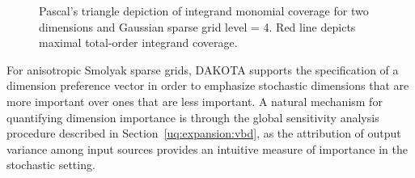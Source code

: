 \begin{figure}[htbp]
  \begin{subfigmatrix}{2}
  \end{subfigmatrix}
  \caption{Pascal's triangle depiction of integrand monomial coverage 
for two dimensions and Gaussian sparse grid level = 4.  Red line depicts 
maximal total-order integrand coverage.}
\label{fig:pascal_sparse_lev4_Gauss}
\end{figure}

For anisotropic Smolyak sparse grids, DAKOTA supports the
specification of a dimension preference vector in order to emphasize
stochastic dimensions that are more important over ones that are less
important.  A natural mechanism for quantifying dimension importance
is through the global sensitivity analysis procedure described in
Section~\ref{uq:expansion:vbd}, as the attribution of output variance
among input sources provides an intuitive measure of importance in the
stochastic setting.


